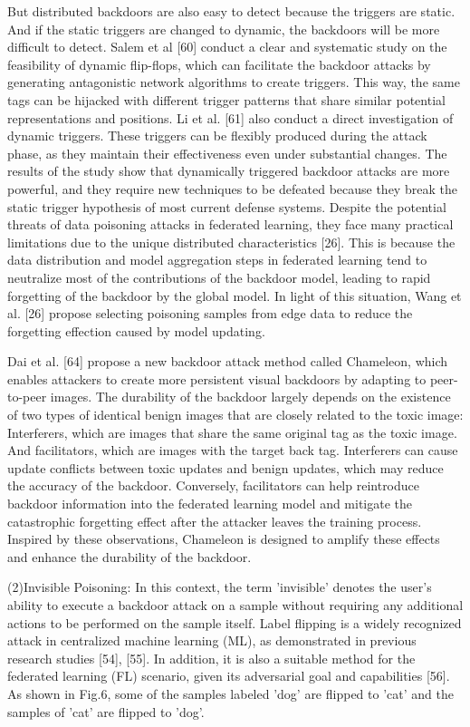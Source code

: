 But distributed backdoors are also easy to detect
because the triggers are static. And if the static triggers are
changed to dynamic, the backdoors will be more diﬀicult
to detect. Salem et al [60] conduct a clear and systematic
study on the feasibility of dynamic flip-flops, which can
facilitate the backdoor attacks by generating antagonistic
network algorithms to create triggers. This way, the same
tags can be hijacked with different trigger patterns that
share similar potential representations and positions. Li
et al. [61] also conduct a direct investigation of dynamic
triggers. These triggers can be flexibly produced during the
attack phase, as they maintain their effectiveness even
under substantial changes. The results of the study show
that dynamically triggered backdoor attacks are more
powerful, and they require new techniques to be defeated
because they break the static trigger hypothesis of most
current defense systems. Despite the potential threats of data poisoning attacks
in federated learning, they face many practical limitations
due to the unique distributed characteristics [26]. This
is because the data distribution and model aggregation
steps in federated learning tend to neutralize most of
the contributions of the backdoor model, leading to rapid
forgetting of the backdoor by the global model. In light of
this situation, Wang et al. [26] propose selecting poisoning
samples from edge data to reduce the forgetting effection
caused by model updating. 

Dai et al. [64] propose a new backdoor attack method
called Chameleon, which enables attackers to create more
persistent visual backdoors by adapting to peer-to-peer
images. The durability of the backdoor largely depends on
the existence of two types of identical benign images that
are closely related to the toxic image: Interferers, which
are images that share the same original tag as the toxic
image. And facilitators, which are images with the target
back tag. Interferers can cause update conflicts between
toxic updates and benign updates, which may reduce the
accuracy of the backdoor. Conversely, facilitators can help
reintroduce backdoor information into the federated
learning model and mitigate the catastrophic forgetting effect
after the attacker leaves the training process. Inspired by
these observations, Chameleon is designed to amplify these
effects and enhance the durability of the backdoor.  

(2)Invisible Poisoning: In this context, the term 
'invisible' denotes the user's ability to execute a backdoor attack
on a sample without requiring any additional actions to
be performed on the sample itself. Label flipping is a widely recognized attack in
centralized machine learning (ML), as demonstrated in previous
research studies [54], [55]. In addition, it is also a suitable
method for the federated learning (FL) scenario, given its
adversarial goal and capabilities [56]. As shown in Fig.6,
some of the samples labeled 'dog' are flipped to 'cat' and
the samples of 'cat' are flipped to 'dog'.  

